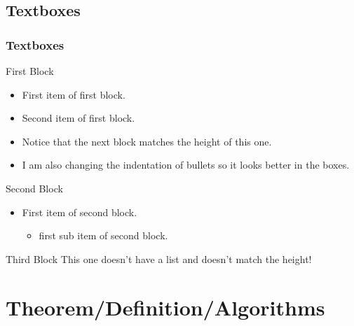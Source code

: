 \documentclass[
	10pt, %
	aspectratio=169, %
]{beamer}
\begin{document}
\subsection{Textboxes}
\begin{frame}
	\frametitle{Textboxes}
	\centering
	\begin{minipage}{0.3\linewidth}
		\begin{primaryblock}[equal height group=A,label=block:first]{First Block}
			\setlength{\leftmargini}{8pt}
			\begin{itemize}
				\item First item of first block.
				\item Second item of first block.
				\item Notice that the next block matches the height of this one.
				\item I am also changing the indentation of bullets so it looks better in the boxes.
			\end{itemize}
		\end{primaryblock}
	\end{minipage}
	\begin{minipage}{0.3\linewidth}
		\begin{secondaryblock}[equal height group=A]{Second Block}
			\setlength{\leftmargini}{8pt}
			\begin{itemize}
				\item First item of second block.
				      \begin{itemize}
					      \item first sub item of second block.
				      \end{itemize}
			\end{itemize}
		\end{secondaryblock}
	\end{minipage}
	\begin{minipage}{0.3\linewidth}
		\begin{primaryblock}[]{Third Block}
			This one doesn't have a list and doesn't match the height!
		\end{primaryblock}
	\end{minipage}
\end{frame}

\section{Theorem/Definition/Algorithms}
\end{document}
